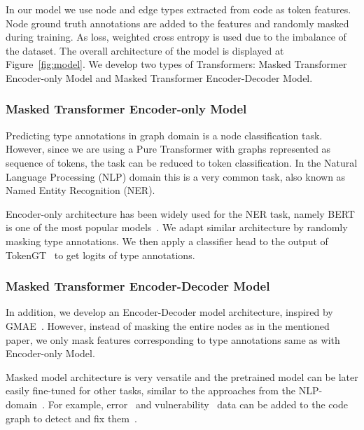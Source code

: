 \begin{figure*}
    \resizebox{\textwidth}{!}{}
    \caption{GraphTyper Architecture}
    \label{fig:model}
\end{figure*}

In our model we use node and edge types extracted from code as token features.
Node ground truth annotations are added to the features and randomly masked during training.
As loss, weighted cross entropy is used due to the imbalance of the dataset.
The overall architecture of the model is displayed at Figure~\ref{fig:model}.
We develop two types of Transformers: Masked Transformer Encoder-only Model and Masked Transformer Encoder-Decoder Model.

\subsubsection{Masked Transformer Encoder-only Model}

Predicting type annotations in graph domain is a node classification task.
However, since we are using a Pure Transformer with graphs represented as sequence of tokens, the task can be reduced to token classification.
In the Natural Language Processing (NLP) domain this is a very common task, also known as Named Entity Recognition (NER).

Encoder-only architecture has been widely used for the NER task, namely BERT is one of the most popular models~\cite{liu2021nerbert,Darji_2023}.
We adapt similar architecture by randomly masking type annotations.
We then apply a classifier head to the output of TokenGT~\cite{kim_pure_2022} to get logits of type annotations.

\subsubsection{Masked Transformer Encoder-Decoder Model}

In addition, we develop an Encoder-Decoder model architecture, inspired by GMAE~\cite{zhang2022graph}.
However, instead of masking the entire nodes as in the mentioned paper, we only mask features corresponding to type annotations
same as with Encoder-only Model.

Masked model architecture is very versatile and the pretrained model can be later easily fine-tuned for other tasks,
similar to the approaches from the NLP-domain~\cite{liu2021nerbert}.
For example, error~\cite{bieber2022static} and vulnerability~\cite{sun2023exploring} data can be added to the code graph to detect and fix them~\cite{nguyen_regvd_2021,li_vuldeepecker_2018,cao_bgnn4vd_2021,li_sysevr_2021,russell_automated_2018}.